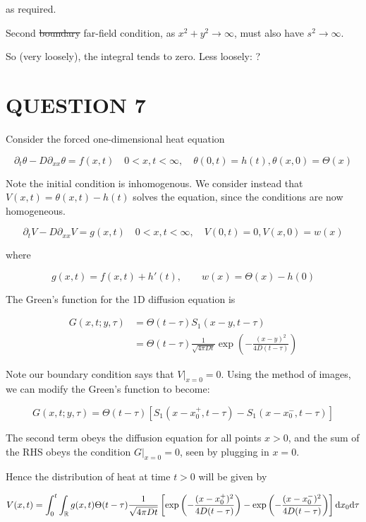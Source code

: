 \documentclass[a4paper]{article}
\begin{document}
as required.

Second \st{boundary} far-field condition, as $ x^{2} + y^{2} \to \infty $, must also have $ s^{2} \to \infty $.

So (very loosely), the integral tends to zero.
Less loosely: ?









\section{QUESTION 7}

Consider the forced one-dimensional heat equation

\[ \partial_{t} \theta - D \partial_{xx} \theta = f(x,t) \quad 0 < x,t < \infty, \quad \theta(0,t) = h(t), \theta(x,0) = \Theta(x)  \]

Note the initial condition is inhomogenous. We consider instead that $ V(x,t) = \theta(x,t) - h(t) $ solves the equation, since the conditions are now homogeneous.


\[ \partial_{t} V - D \partial_{xx} V= g(x,t) \quad 0 < x,t < \infty, \quad V(0,t) = 0, V(x,0) = w(x)  \]

where

\[ g(x,t) = f(x,t) + h'(t), \qquad w(x) = \Theta(x) - h(0) \]

The Green's function for the 1D diffusion equation is

\begin{align*}
G(x,t; y,\tau) & = \Theta(t-\tau) S_{1}(x-y,t-\tau) \\
& = \Theta(t-\tau) \frac{1}{\sqrt{4 \pi D t}} \exp \left(   - \frac{(x-y)^{2}}{4 D (t - \tau)} \right) 
\end{align*}

Note our boundary condition says that $ V|_{x=0} = 0 $. Using the method of images, we can modify the Green's function to become:

\[ G(x,t; y,\tau) = \Theta(t-\tau) [ S_{1}(x-x_{0}^{+},t-\tau) - S_{1}(x-x_{0}^{-},t-\tau) ] \]

The second term obeys the diffusion equation for all points $ x > 0 $, and the sum of the RHS obeys the condition $ G |_{x = 0} = 0 $, seen by plugging in $ x = 0 $.

Hence the distribution of heat at time $ t > 0 $ will be given by

\[ V(x,t) = \int_{0}^{t} \int_{\mathbb{R}} g(x,t)\Theta(t-\tau) \frac{1}{\sqrt{4 \pi D t}} \left[ \exp \left(   - \frac{(x-x_{0}^{+})^{2}}{4 D (t - \tau)} \right) - \exp \left(   - \frac{(x-x_{0}^{-})^{2}}{4 D (t - \tau)} \right)  \right]   \mathrm{d} x_{0} \mathrm{d} \tau \]
\end{document}
